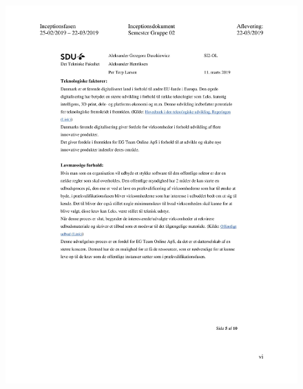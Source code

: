 \begin{figure}[hb]
  \includegraphics[scale = 0.33]{./PNG/Inceptions/Gruppe02+InceptionsDokument-39.jpg} 
\end{figure}

